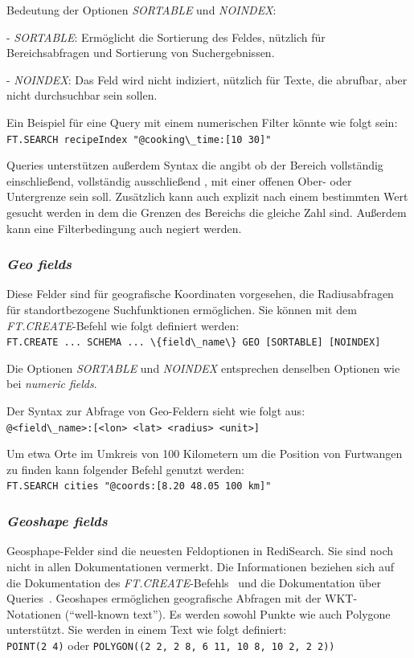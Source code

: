 Bedeutung der Optionen \emph{SORTABLE} und \emph{NOINDEX}:

- \emph{SORTABLE}: Ermöglicht die Sortierung des Feldes, nützlich für Bereichsabfragen und Sortierung von Suchergebnissen.

- \emph{NOINDEX}: Das Feld wird nicht indiziert, nützlich für Texte, die abrufbar, aber nicht durchsuchbar sein sollen.

Ein Beispiel für eine Query mit einem numerischen Filter könnte wie folgt sein:\\
\lstinline|FT.SEARCH recipeIndex "@cooking\_time:[10 30]"|

Queries unterstützen außerdem Syntax die angibt ob der Bereich vollständig einschließend, vollständig ausschließend , mit einer offenen Ober- oder Untergrenze sein soll. Zusätzlich kann auch explizit nach einem bestimmten Wert gesucht werden in dem die Grenzen des Bereichs die gleiche Zahl sind. Außerdem kann eine Filterbedingung auch negiert werden.

\subsubsection{\emph{Geo fields}} Diese Felder sind für geografische Koordinaten vorgesehen, die Radiusabfragen für standortbezogene Suchfunktionen ermöglichen.
Sie können mit dem \emph{FT.CREATE}-Befehl wie folgt definiert werden:\\
\lstinline|FT.CREATE ... SCHEMA ... \{field\_name\} GEO [SORTABLE] [NOINDEX]|

Die Optionen \emph{SORTABLE} und \emph{NOINDEX} entsprechen denselben Optionen wie bei \emph{numeric fields}. 

Der Syntax zur Abfrage von Geo-Feldern sieht wie folgt aus:\\
\lstinline|@<field\_name>:[<lon> <lat> <radius> <unit>]|

Um etwa Orte im Umkreis von 100 Kilometern um die Position von Furtwangen zu finden kann folgender Befehl genutzt werden:\\
\lstinline|FT.SEARCH cities "@coords:[8.20 48.05 100 km]"|

\subsubsection{\emph{Geoshape fields}}
Geosphape-Felder sind die neuesten Feldoptionen in RediSearch. Sie sind noch nicht in allen Dokumentationen vermerkt. Die Informationen beziehen sich auf die Dokumentation des \emph{FT.CREATE}-Befehls~\cite{redis_ltd_ftcreate_nodate} und die Dokumentation über Queries~\cite{redis_ltd_query_nodate}. 
Geoshapes ermöglichen geografische Abfragen mit der WKT-Notationen (\enquote{well-known text}).
Es werden sowohl Punkte wie auch Polygone unterstützt. Sie werden in einem Text wie folgt definiert:\\
\lstinline|POINT(2 4)| oder \lstinline|POLYGON((2 2, 2 8, 6 11, 10 8, 10 2, 2 2))|

